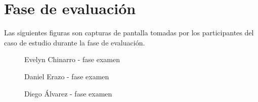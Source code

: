 \section{Fase de evaluación}
Las siguientes figuras son capturas de pantalla tomadas por los participantes del caso de estudio durante la fase de evaluación.
\begin{figure}[h]
	\centering
	\caption{Evelyn Chinarro - fase examen}
	\label{fig:evy_fase_examen}
\end{figure}
\begin{figure}[h]
	\centering
	\caption{Daniel Erazo - fase examen}
	\label{fig:daniel_fase_examen}
\end{figure}
\begin{figure}[h]
	\centering
	\caption{Diego Álvarez - fase examen}
	\label{fig:diego_fase_examen}
\end{figure}
